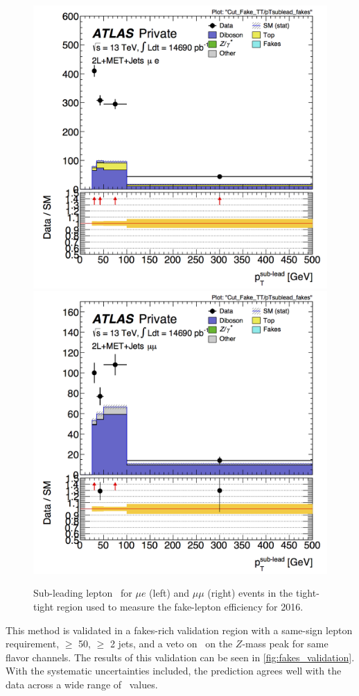\begin{centering}
\begin{figure}[htbp]
\centering
\includegraphics[width=.45\textwidth]{figures/fakes/me-Cut_Fake_TT-pTsublead_fakes-lin_2016.png}
\includegraphics[width=.45\textwidth]{figures/fakes/mm-Cut_Fake_TT-pTsublead_fakes-lin_2016.png}
\caption{Sub-leading lepton \pT\ for $\mu e$ (left) and $\mu\mu$ (right) events in the tight-tight region used to measure the fake-lepton efficiency for 2016.}
\label{fig:fake_fakereg}
\end{figure}
\end{centering}

This method is validated in a fakes-rich validation region with a same-sign lepton requirement, \met $\geq$ 50\gev, $\geq$ 2 jets, and a veto on \mll~on the $Z$-mass peak for same flavor channels. The results of this validation can be seen in \autoref{fig:fakes_validation}. With the systematic uncertainties included, the prediction agrees well with the data across a wide range of \mll~values. 


